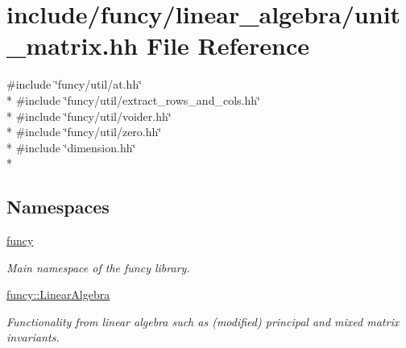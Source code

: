 \hypertarget{unit__matrix_8hh}{\section{include/funcy/linear\-\_\-algebra/unit\-\_\-matrix.hh File Reference}
\label{unit__matrix_8hh}
}
{\ttfamily \#include \char`\"{}funcy/util/at.\-hh\char`\"{}}\\*
{\ttfamily \#include \char`\"{}funcy/util/extract\-\_\-rows\-\_\-and\-\_\-cols.\-hh\char`\"{}}\\*
{\ttfamily \#include \char`\"{}funcy/util/voider.\-hh\char`\"{}}\\*
{\ttfamily \#include \char`\"{}funcy/util/zero.\-hh\char`\"{}}\\*
{\ttfamily \#include \char`\"{}dimension.\-hh\char`\"{}}\\*
\subsection*{Namespaces}
\begin{DoxyCompactItemize}
\item 
\hyperlink{namespacefuncy}{funcy}
\begin{DoxyCompactList}\small\item\em Main namespace of the funcy library. \end{DoxyCompactList}\item 
\hyperlink{namespacefuncy_1_1LinearAlgebra}{funcy\-::\-Linear\-Algebra}
\begin{DoxyCompactList}\small\item\em Functionality from linear algebra such as (modified) principal and mixed matrix invariants. \end{DoxyCompactList}\end{DoxyCompactItemize}
